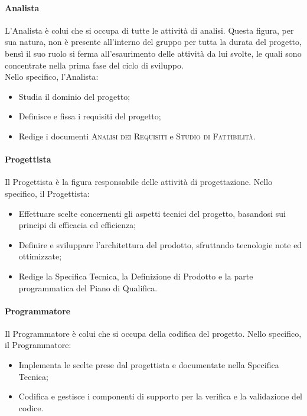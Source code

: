 \documentclass[../norme-di-progetto.tex]{subfiles}
\begin{document}
\paragraph{Analista}
L'Analista è colui che si occupa di tutte le attività di analisi. Questa figura, per sua natura, non è presente all'interno del gruppo per tutta la durata del progetto, bensì il suo ruolo si ferma all'esaurimento delle attività da lui svolte, le quali sono concentrate nella prima fase del ciclo di sviluppo. \\
Nello specifico, l'Analista:
\begin{itemize}
  \item Studia il dominio del progetto;
  \item Definisce e fissa i requisiti del progetto;
  \item Redige i documenti \textsc{Analisi dei Requisiti} e \textsc{Studio di Fattibilità}.
\end{itemize}

\paragraph{Progettista}
Il Progettista è la figura responsabile delle attività di progettazione. Nello specifico, il Progettista:
\begin{itemize}
  \item Effettuare scelte concernenti gli aspetti tecnici del progetto, basandosi sui principi di efficacia ed efficienza;
  \item Definire e sviluppare l'architettura del prodotto, sfruttando tecnologie note ed ottimizzate;
  \item Redige la Specifica Tecnica, la Definizione di Prodotto e la parte programmatica del Piano di Qualifica.
\end{itemize}

\paragraph{Programmatore}
Il Programmatore è colui che si occupa della codifica del progetto. Nello specifico, il Programmatore:
\begin{itemize}
  \item Implementa le scelte prese dal progettista e documentate nella Specifica Tecnica;
  \item Codifica e gestisce i componenti di supporto per la verifica e la validazione del codice.
\end{itemize}
\end{document}
